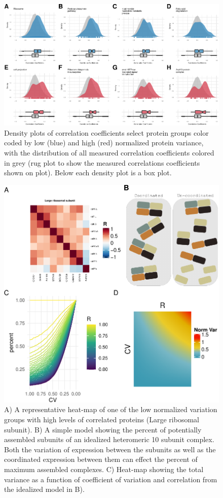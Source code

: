 \documentclass[11pt,]{article}
\begin{document}
\newpage

\begin{figure}
\centering
\includegraphics{output/figures/figure_3-1.pdf}
\caption{Density plots of correlation coefficients select protein groups
color coded by low (blue) and high (red) normalized protein variance,
with the distribution of all measured correlation coefficients colored
in grey (rug plot to show the measured correlations coefficients shown
on plot). Below each density plot is a box plot.}
\end{figure}

\newpage

\begin{figure}
\centering
\includegraphics{output/figures/figure_4-1.pdf}
\caption{A) A representative heat-map of one of the low normalized
variation groups with high levels of correlated proteins (Large
ribosomal subunit). B) A simple model showing the percent of potentially
assembled subunits of an idealized heteromeric 10 subunit complex. Both
the variation of expression between the subunits as well as the
coordinated expression between them can effect the percent of maximum
assembled complexes. C) Heat-map showing the total variance as a
function of coefficient of variation and correlation from the idealized
model in B).}
\end{figure}
\end{document}
